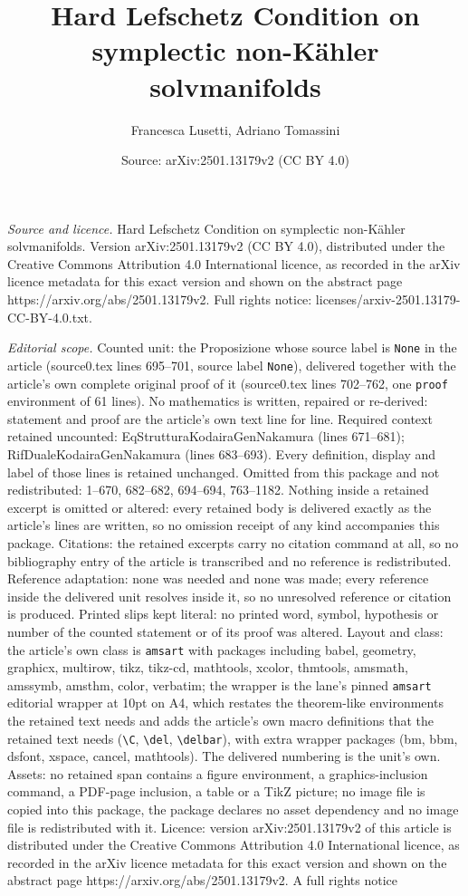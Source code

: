 \documentclass[10pt,a4paper]{amsart}
\title[Hard Lefschetz Condition on symplectic non-K\"ahler solvmani]{Hard Lefschetz Condition on symplectic non-K\"ahler solvmanifolds}
\author{Francesca Lusetti, Adriano Tomassini}
\date{Source: arXiv:2501.13179v2 (CC BY 4.0)}
\begin{document}
\maketitle

\noindent\emph{Source and licence.} Hard Lefschetz Condition on symplectic non-K\"ahler solvmanifolds. Version arXiv:2501.13179v2 (CC BY 4.0), distributed under the Creative Commons Attribution 4.0 International licence, as recorded in the arXiv licence metadata for this exact version and shown on the abstract page https://arxiv.org/abs/2501.13179v2. Full rights notice: licenses/arxiv-2501.13179-CC-BY-4.0.txt.\par\smallskip

\noindent\textit{Editorial scope.} Counted unit: the Proposizione whose source label is \texttt{None} in the article (source0.tex lines 695--701, source label \texttt{None}), delivered together with the article's own complete original proof of it (source0.tex lines 702--762, one \texttt{proof} environment of 61 lines). No mathematics is written, repaired or re-derived: statement and proof are the article's own text line for line. Required context retained uncounted: EqStrutturaKodairaGenNakamura (lines 671--681); RifDualeKodairaGenNakamura (lines 683--693). Every definition, display and label of those lines is retained unchanged. Omitted from this package and not redistributed: 1--670, 682--682, 694--694, 763--1182. Nothing inside a retained excerpt is omitted or altered: every retained body is delivered exactly as the article's lines are written, so no omission receipt of any kind accompanies this package. Citations: the retained excerpts carry no citation command at all, so no bibliography entry of the article is transcribed and no reference is redistributed. Reference adaptation: none was needed and none was made; every reference inside the delivered unit resolves inside it, so no unresolved reference or citation is produced. Printed slips kept literal: no printed word, symbol, hypothesis or number of the counted statement or of its proof was altered. Layout and class: the article's own class is \texttt{amsart} with packages including babel, geometry, graphicx, multirow, tikz, tikz-cd, mathtools, xcolor, thmtools, amsmath, amssymb, amsthm, color, verbatim; the wrapper is the lane's pinned \texttt{amsart} editorial wrapper at 10pt on A4, which restates the theorem-like environments the retained text needs and adds the article's own macro definitions that the retained text needs (\texttt{\textbackslash C}, \texttt{\textbackslash del}, \texttt{\textbackslash delbar}), with extra wrapper packages (bm, bbm, dsfont, xspace, cancel, mathtools). The delivered numbering is the unit's own. Assets: no retained span contains a figure environment, a graphics-inclusion command, a PDF-page inclusion, a table or a TikZ picture; no image file is copied into this package, the package declares no asset dependency and no image file is redistributed with it. Licence: version arXiv:2501.13179v2 of this article is distributed under the Creative Commons Attribution 4.0 International licence, as recorded in the arXiv licence metadata for this exact version and shown on the abstract page https://arxiv.org/abs/2501.13179v2. A full rights notice 
\end{document}
